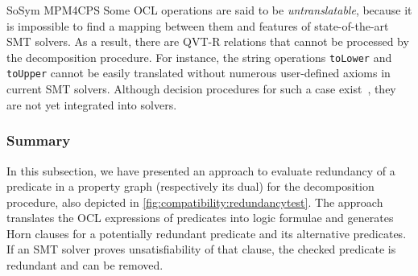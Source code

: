 \begin{copiedFrom}{SoSym MPM4CPS}
Some OCL operations are said to be \textit{untranslatable}, because it is impossible to find a mapping between them and features of state-of-the-art SMT solvers. As a result, there are QVT-R relations that cannot be processed by the decomposition procedure. For instance, the string operations \lstinline{toLower} and \lstinline{toUpper} cannot be easily translated without numerous user-defined axioms in current SMT solvers. Although decision procedures for such a case exist~\cite{veanes2012transducers}, they are not yet integrated into solvers.


\subsubsection*{Summary}
In this subsection, we have presented an approach to evaluate redundancy of a predicate in a property graph (respectively its dual) for the decomposition procedure, also depicted in \autoref{fig:compatibility:redundancytest}.
The approach translates the OCL expressions of predicates into logic formulae and generates Horn clauses for a potentially redundant predicate and its alternative predicates.
If an SMT solver proves unsatisfiability of that clause, the checked predicate is redundant and can be removed.

\end{copiedFrom} %